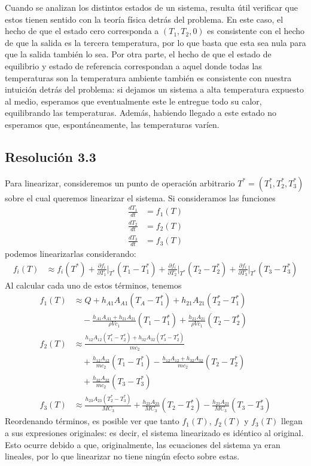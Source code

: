 \documentclass[
  11pt,
  letterpaper,
   addpoints,
   answers
  ]{exam}
\begin{document}
\begin{questions}
\begin{solution}
Cuando se analizan los distintos estados de un sistema, resulta útil verificar que estos tienen sentido con la teoría física detrás del problema. En este caso, el hecho de que el estado cero corresponda a $(T_1, T_2, 0)$ es consistente con el hecho de que la salida es la tercera temperatura, por lo que basta que esta sea nula para que la salida también lo sea. Por otra parte, el hecho de que el estado de equilibrio y estado de referencia correspondan a aquel donde todas las temperaturas son la temperatura ambiente también es consistente con nuestra intuición detrás del problema: si dejamos un sistema a alta temperatura expuesto al medio, esperamos que eventualmente este le entregue todo su calor, equilibrando las temperaturas. Además, habiendo llegado a este estado no esperamos que, espontáneamente, las temperaturas varíen.
\subsection*{Resolución 3.3}
Para linearizar, consideremos un punto de operación arbitrario $T^* = (T_1^*, T_2^*, T_3^*)$ sobre el cual queremos linearizar el sistema. Si consideramos las funciones
\begin{align}
    \frac{dT_1}{dt} &= f_1(T) \tag{27} \\
    \frac{dT_2}{dt} &= f_2(T) \tag{28} \\
    \frac{dT_3}{dt} &= f_3(T) \tag{29}
\end{align}
podemos linearizarlas considerando:
\begin{align}
    f_i(T) &\approx f_i(T^*) + \frac{\partial f_i}{\partial T_1}\Big|_{T^*} (T_1 - T_1^*) + \frac{\partial f_i}{\partial T_2}\Big|_{T^*} (T_2 - T_2^*) + \frac{\partial f_i}{\partial T_3}\Big|_{T^*} (T_3 - T_3^*) \tag{30}
\end{align}
Al calcular cada uno de estos términos, tenemos
\begin{align}
    f_1(T) &\approx Q + h_{A1}A_{A1} (T_A - T_1^*) + h_{21}A_{21} (T_2^* - T_1^*) \nonumber \\
    &\quad - \frac{h_{A1}A_{A1} + h_{21}A_{21}}{\rho V c_1} (T_1 - T_1^*) + \frac{h_{21}A_{21}}{\rho V c_1} (T_2 - T_2^*) \tag{31} \\
    f_2(T) &\approx \frac{h_{12}A_{12} (T_1^* - T_2^*) + h_{32}A_{32} (T_3^* - T_2^*)}{mc_2} \nonumber \\
    &\quad + \frac{h_{12}A_{12}}{mc_2} (T_1 - T_1^*) - \frac{h_{12}A_{12} + h_{32}A_{32}}{mc_2} (T_2 - T_2^*) \nonumber \\
    &\quad + \frac{h_{32}A_{32}}{mc_2} (T_3 - T_3^*) \tag{32} \\
    f_3(T) &\approx \frac{h_{23}A_{23} (T_2^* - T_3^*)}{MC_3} + \frac{h_{23}A_{23}}{MC_3} (T_2 - T_2^*) - \frac{h_{23}A_{23}}{MC_3} (T_3 - T_3^*) \tag{33}
    \end{align}    
Reordenando términos, es posible ver que tanto $f_1(T)$, $f_2(T)$ y $f_3(T)$ llegan a sus expresiones originales: es decir, el sistema linearizado es idéntico al original. Esto ocurre debido a que, originalmente, las ecuaciones del sistema ya eran lineales, por lo que linearizar no tiene ningún efecto sobre estas.    


\end{solution}
\end{questions}
\end{document}
